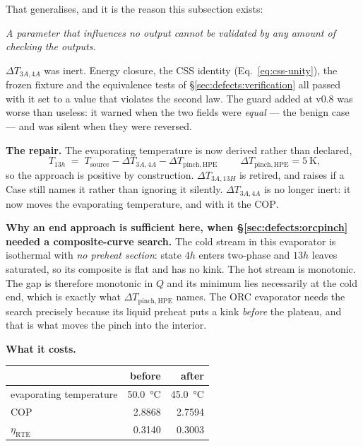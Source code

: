 That generalises, and it is the reason this subsection exists:

\begin{center}
\emph{A parameter that influences no output cannot be validated by any amount of
checking the outputs.}
\end{center}

\noindent
$\Delta T_{3A,4A}$ was inert. Energy closure, the CSS identity
(Eq.~\eqref{eq:css-unity}), the frozen fixture and the equivalence tests of
\S\ref{sec:defects:verification} all passed with it set to a value that violates
the second law. The guard added at v0.8 was worse than useless: it warned when
the two fields were \emph{equal} --- the benign case --- and was silent when
they were reversed.

\medskip
\noindent\textbf{The repair.} The evaporating temperature is now derived rather
than declared,
\begin{equation}
  \boxed{\;T_{13h} \;=\; T_{\mathrm{source}} - \Delta T_{3A,4A}
          - \Delta T_{\mathrm{pinch,HPE}}\;}
  \qquad \Delta T_{\mathrm{pinch,HPE}} = \SI{5}{\kelvin},
  \label{eq:hpe-new}
\end{equation}
so the approach is positive by construction. $\Delta T_{3A,13H}$ is retired, and
 raises if a Case still names it rather than ignoring it
silently. $\Delta T_{3A,4A}$ is no longer inert: it now moves the evaporating
temperature, and with it the $\mathrm{COP}$.

\medskip
\noindent\textbf{Why an end approach is sufficient here, when
\S\ref{sec:defects:orcpinch} needed a composite-curve search.} The cold stream
in this evaporator is isothermal with \emph{no preheat section}: state $4h$
enters two-phase and $13h$ leaves saturated, so its composite is flat and has no
kink. The hot stream is monotonic. The gap is therefore monotonic in $Q$ and its
minimum lies necessarily at the cold end, which is exactly what
$\Delta T_{\mathrm{pinch,HPE}}$ names. The ORC evaporator needs the search
precisely because its liquid preheat puts a kink \emph{before} the plateau, and
that is what moves the pinch into the interior.

\medskip
\noindent\textbf{What it costs.}

\begin{center}
\begin{tabular}{@{}l r r@{}}
\toprule
 & before & after \\
\midrule
evaporating temperature & \SI{50.0}{\celsius} & \SI{45.0}{\celsius} \\
$\mathrm{COP}$          & 2.8868 & 2.7594 \\
$\eta_{\mathrm{RTE}}$   & 0.3140 & 0.3003 \\
\bottomrule
\end{tabular}
\end{center}


